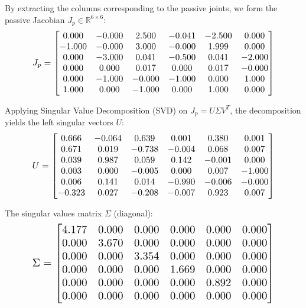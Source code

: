 \documentclass[12pt,a4paper]{article}
\begin{document}
By extracting the columns corresponding to the passive joints, we form the passive Jacobian $J_p \in \mathbb{R}^{6 \times 6}$:
\begin{equation}
    \resizebox{0.85\textwidth}{!}{$ J_p = \begin{bmatrix}
  0.000 & -0.000 & 2.500 & -0.041 & -2.500 & 0.000 \\
  -1.000 & -0.000 & 3.000 & -0.000 & 1.999 & 0.000 \\
  0.000 & -3.000 & 0.041 & -0.500 & 0.041 & -2.000 \\
  0.000 & 0.000 & 0.017 & 0.000 & 0.017 & -0.000 \\
  0.000 & -1.000 & -0.000 & -1.000 & 0.000 & 1.000 \\
  1.000 & 0.000 & -1.000 & 0.000 & 1.000 & 0.000
\end{bmatrix} $}
\end{equation}

Applying Singular Value Decomposition (SVD) on $J_p = U \Sigma V^T$, the decomposition yields the left singular vectors $U$:
\begin{equation}
    \resizebox{0.85\textwidth}{!}{$ U = \begin{bmatrix}
  0.666 & -0.064 & 0.639 & 0.001 & 0.380 & 0.001 \\
  0.671 & 0.019 & -0.738 & -0.004 & 0.068 & 0.007 \\
  0.039 & 0.987 & 0.059 & 0.142 & -0.001 & 0.000 \\
  0.003 & 0.000 & -0.005 & 0.000 & 0.007 & -1.000 \\
  0.006 & 0.141 & 0.014 & -0.990 & -0.006 & -0.000 \\
  -0.323 & 0.027 & -0.208 & -0.007 & 0.923 & 0.007
\end{bmatrix} $}
\end{equation}

The singular values matrix $\Sigma$ (diagonal):
\begin{equation}
    \resizebox{0.85\textwidth}{!}{$ \Sigma = \begin{bmatrix}
  4.177 & 0.000 & 0.000 & 0.000 & 0.000 & 0.000 \\
  0.000 & 3.670 & 0.000 & 0.000 & 0.000 & 0.000 \\
  0.000 & 0.000 & 3.354 & 0.000 & 0.000 & 0.000 \\
  0.000 & 0.000 & 0.000 & 1.669 & 0.000 & 0.000 \\
  0.000 & 0.000 & 0.000 & 0.000 & 0.892 & 0.000 \\
  0.000 & 0.000 & 0.000 & 0.000 & 0.000 & 0.000
\end{bmatrix} $}
\end{equation}
\end{document}
